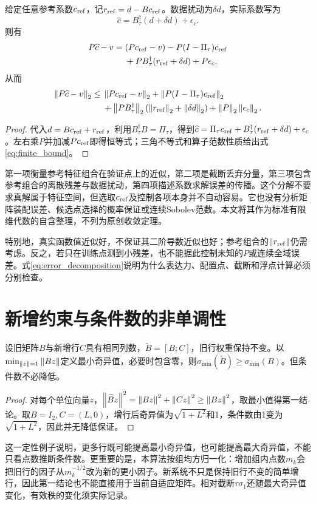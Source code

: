 \begin{proposition}[固定离散系统的误差恒等式]\label{prop:finite_error}
给定任意参考系数$c_{\rm ref}$，记$r_{\rm ref}=d-Bc_{\rm ref}$。数据扰动为$\delta d$，实际系数写为
\[\widehat c=B_\tau^\dagger(d+\delta d)+\epsilon_c.\]
则有
\begin{align}
P\widehat c-v={}&(Pc_{\rm ref}-v)-P(I-\Pi_\tau)c_{\rm ref}\nonumber\\
&+PB_\tau^\dagger(r_{\rm ref}+\delta d)+P\epsilon_c.\label{eq:error_decomposition}
\end{align}
从而
\begin{align}
\left\lVert P\widehat c-v\right\rVert_2\le{}&\left\lVert Pc_{\rm ref}-v\right\rVert_2+\left\lVert P(I-\Pi_\tau)c_{\rm ref}\right\rVert_2\nonumber\\
&+\left\lVert PB_\tau^\dagger\right\rVert_2(\left\lVert r_{\rm ref}\right\rVert_2+\left\lVert\delta d\right\rVert_2)
+\left\lVert P\right\rVert_2\left\lVert\epsilon_c\right\rVert_2.\label{eq:finite_bound}
\end{align}
\end{proposition}
\begin{proof}
代入$d=Bc_{\rm ref}+r_{\rm ref}$，利用$B_\tau^\dagger B=\Pi_\tau$，得到$\widehat c=\Pi_\tau c_{\rm ref}+B_\tau^\dagger(r_{\rm ref}+\delta d)+\epsilon_c$。左右乘$P$并加减$Pc_{\rm ref}$即得恒等式；三角不等式和算子范数性质给出式\eqref{eq:finite_bound}。
\end{proof}

第一项衡量参考特征组合在验证点上的近似，第二项是截断丢弃分量，第三项包含参考组合的离散残差与数据扰动，第四项描述系数求解误差的传播。这个分解不要求真解属于特征空间，但选取$c_{\rm ref}$及控制各项本身并不自动容易。它也没有分析矩阵装配误差、候选点选择的概率保证或连续Sobolev范数。本文将其作为标准有限维代数的自含整理，不列为原创收敛定理。

特别地，真实函数值近似好，不保证其二阶导数近似也好；参考组合的$\left\lVert r_{\rm ref}\right\rVert$仍需考虑。反之，若只在训练点测到小残差，也不能据此控制未知的$P$或连续全域误差。式\eqref{eq:error_decomposition}说明为什么表达力、配置点、截断和浮点计算必须分别检查。

\section{新增约束与条件数的非单调性}
\begin{proposition}[固定列空间的增行性质]\label{prop:rows}
设旧矩阵$B$与新增行$C$具有相同列数，$\widetilde B=[B;C]$，旧行权重保持不变。以$\min_{\left\lVert z\right\rVert=1}\left\lVert Bz\right\rVert$定义最小奇异值，必要时包含零，则$\sigma_{\min}(\widetilde B)\ge\sigma_{\min}(B)$。但条件数不必降低。
\end{proposition}
\begin{proof}
对每个单位向量$z$，$\left\lVert\widetilde Bz\right\rVert^2=\left\lVert Bz\right\rVert^2+\left\lVert Cz\right\rVert^2\ge\left\lVert Bz\right\rVert^2$，取最小值得第一结论。取$B=I_2,C=(L,0)$，增行后奇异值为$\sqrt{1+L^2}$和1，条件数由1变为$\sqrt{1+L^2}$，因此并无降低保证。
\end{proof}

这一定性例子说明，更多行既可能提高最小奇异值，也可能提高最大奇异值，不能只看点数推断条件数。更重要的是，本算法按组均方归一化：增加组内点数$m_k$会把旧行的因子从$m_k^{-1/2}$改为新的更小因子。新系统不只是保持旧行不变的简单增行，因此第一结论也不能直接用于当前自适应矩阵。相对截断$\tau\sigma_1$还随最大奇异值变化，有效秩的变化须实际记录。


